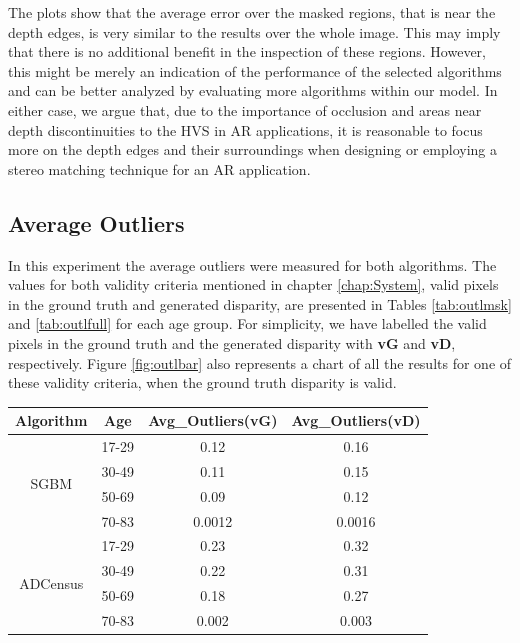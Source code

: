 The plots show that the average error over the masked regions, that is near the depth edges, is very similar to the results over the whole image. 
This may imply that there is no additional benefit in the inspection of these regions. 
However, this might be merely an indication of the performance of the selected algorithms and can be better analyzed by evaluating more algorithms 
within our model.
In either case, we argue that, due to the importance of occlusion and areas near depth discontinuities to the HVS in AR applications, 
it is reasonable to focus more on the depth edges and their surroundings when designing or employing a stereo matching technique for an AR application.

\subsection{Average Outliers}
In this experiment the average outliers were measured for both algorithms. 
The values for both validity criteria mentioned in chapter \ref{chap:System}, valid pixels in the ground truth and generated disparity, 
are presented in Tables \ref{tab:outlmsk} and \ref{tab:outlfull} for each age group. For simplicity, we have labelled the valid pixels
in the ground truth and the generated disparity with \textbf{vG} and \textbf{vD}, respectively.
Figure \ref{fig:outlbar} also represents a chart of all the results for one of these validity criteria, when the ground truth disparity is valid.

\begin{minipage}{0.8\linewidth}
\begin{center}
\label{tab:outlmsk}
\begin{tabular}{ |c|c|c|c| }
\hline
Algorithm & Age & Avg\_Outliers(vG) & Avg\_Outliers(vD) \\ \hline
\multirow{4}{*}{SGBM} & 17-29 & 0.12 & 0.16 \\
& 30-49 & 0.11 & 0.15 \\
& 50-69 & 0.09 & 0.12 \\
& 70-83 & 0.0012 & 0.0016 \\ \hline
\multirow{4}{*}{ADCensus} & 17-29 & 0.23 & 0.32 \\
& 30-49 & 0.22 & 0.31 \\
& 50-69 & 0.18 & 0.27 \\
& 70-83 & 0.002 & 0.003 \\ \hline
\end{tabular}
\end{center}
\end{minipage} \newline \newline

